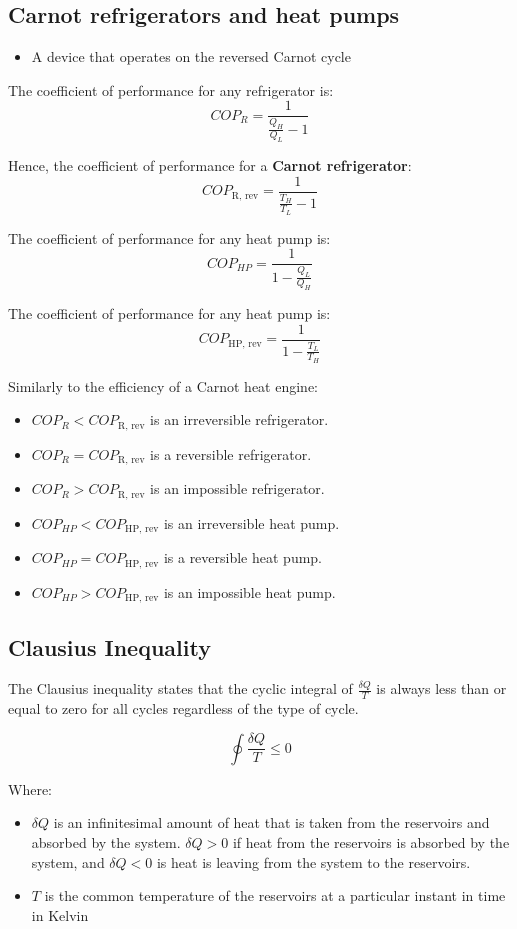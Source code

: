\documentclass[11pt]{article}
\begin{document}
\subsection{Carnot refrigerators and heat pumps}
\label{sec:org2d93e57}
\begin{itemize}
\item A device that operates on the reversed Carnot cycle
\end{itemize}

The coefficient of performance for any refrigerator is:
\[COP_R = \frac{1}{\frac{Q_H}{Q_L} - 1}\]

Hence, the coefficient of performance for a \textbf{Carnot refrigerator}:
\[COP_{\text{R, rev}} = \frac{1}{\frac{T_H}{T_L} - 1}\]

The coefficient of performance for any heat pump is:
\[COP_{HP} = \frac{1}{1 - \frac{Q_L}{Q_H}}\]

The coefficient of performance for any heat pump is:
\[COP_{\text{HP, rev}} = \frac{1}{1 - \frac{T_L}{T_H}}\]

Similarly to the efficiency of a Carnot heat engine:
\begin{itemize}
\item \(COP_{R} < COP_{\text{R, rev}}\) is an irreversible refrigerator.
\item \(COP_{R} = COP_{\text{R, rev}}\) is a reversible refrigerator.
\item \(COP_{R} > COP_{\text{R, rev}}\) is an impossible refrigerator.
\item \(COP_{HP} < COP_{\text{HP, rev}}\) is an irreversible heat pump.
\item \(COP_{HP} = COP_{\text{HP, rev}}\) is a reversible heat pump.
\item \(COP_{HP} > COP_{\text{HP, rev}}\) is an impossible heat pump.
\end{itemize}

 \newpage
\subsection{Clausius Inequality}
\label{sec:org908a165}
The Clausius inequality states that the cyclic integral of \(\frac{\delta Q}{T}\) is always less than or equal to zero for all cycles regardless of the type of cycle.

\[\oint \frac{\delta Q}{T} \leq 0\]

Where:
\begin{itemize}
\item \(\delta Q\) is an infinitesimal amount of heat that is taken from the reservoirs and absorbed by the system. \(\delta Q > 0\) if heat from the reservoirs is absorbed by the system, and \(\delta Q < 0\) is heat is leaving from the system to the reservoirs.
\item \(T\) is the common temperature of the reservoirs at a particular instant in time in Kelvin
\end{itemize}
\end{document}
